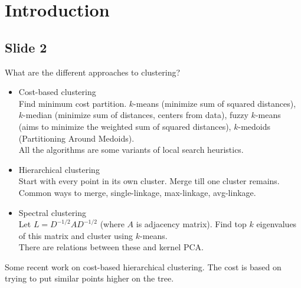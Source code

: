 \documentclass[12pt]{article}
\begin{document}
\section{Introduction}
\subsection*{Slide 2}
What are the different approaches to clustering?
\begin{itemize}
	\item Cost-based clustering\\
	Find minimum cost partition. $k$-means (minimize sum of squared distances), $k$-median (minimize sum of distances, centers from data), fuzzy $k$-means (aims to minimize the weighted sum of squared distances), $k$-medoids (Partitioning Around Medoids). \\
	All the algorithms are some variants of local search heuristics.
	\item Hierarchical clustering\\
	Start with every point in its own cluster. Merge till one cluster remains. Common ways to merge, single-linkage, max-linkage, avg-linkage.
	\item Spectral clustering\\
	Let $L = D^{-1/2} A D^{-1/2}$ (where $A$ is adjacency matrix). Find top $k$ eigenvalues of this matrix and cluster using $k$-means.\\
	There are relations between these and kernel PCA.
\end{itemize}
Some recent work on cost-based hierarchical clustering. The cost is based on trying to put similar points higher on the tree.
\end{document}
